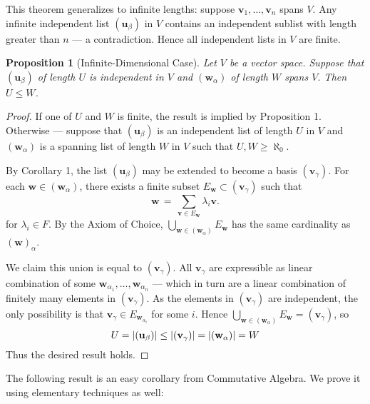 \documentclass[11pt]{article}
\newtheorem{proposition}{Proposition}
\renewcommand{\vec}[1]{\mathbf{#1}}
\begin{document}
This theorem generalizes to infinite lengths: suppose $\vec{v}_{1}, \ldots, \vec{v}_{n}$ spans $V$. Any infinite independent list $(\vec{u}_{\beta})$ in $V$ contains an independent sublist with length greater than $n$ --- a contradiction. Hence all independent lists in $V$ are finite.

\begin{adjustwidth}{0.5cm}{}
  \begin{proposition}[Infinite-Dimensional Case]
    Let $V$ be a vector space. Suppose that $(\vec{u}_{\beta})$ of length $U$ is independent in $V$ and $(\vec{w}_{\alpha})$ of length $W$ spans $V$. Then $U \le W$.
  \end{proposition}
  \begin{proof}
    If one of $U$ and $W$ is finite, the result is implied by Proposition 1. Otherwise --- suppose that $(\vec{u}_{\beta})$ is an independent list of length $U$ in $V$ and $(\vec{w}_{\alpha})$ is a spanning list of length $W$ in $V$ such that $U, W \ge \aleph_{0}$. 

    By Corollary 1, the list $(\vec{u}_{\beta})$ may be extended to become a basis $(\vec{v}_{\gamma})$. For each $\vec{w} \in (\vec{w}_{\alpha})$, there exists a finite subset $E_{\vec{w}} \subset (\vec{v}_{\gamma})$ such that
    \[
      \vec{w} \, = \, \sum\limits_{\vec{v} \in E_{\vec{w}}} \lambda_{i} \vec{v}.
    \]
    for $\lambda_{i} \in F$. By the Axiom of Choice, $\bigcup\limits_{\vec{w} \in (\vec{w}_{\alpha})} E_{\vec{w}}$ has the same cardinality as $(\vec{w})_{\alpha}$. 

    We claim this union is equal to $(\vec{v}_{\gamma})$. All $\vec{v}_{\gamma}$ are expressible as linear combination of some $\vec{w}_{\alpha_{1}}, \ldots, \vec{w}_{\alpha_{n}}$ --- which in turn are a linear combination of finitely many elements in $(\vec{v}_{\gamma})$. As the elements in $(\vec{v}_{\gamma})$ are independent, the only possibility is that $\vec{v}_{\gamma} \in E_{\vec{w}_{\alpha_{i}}}$ for some $i$. Hence $\bigcup\limits_{\vec{w} \in (\vec{w}_{\alpha})} E_{\vec{w}} = (\vec{v}_{\gamma})$, so
    \[
      U = \abs{(\vec{u}_{\beta})} \le \abs{(\vec{v}_{\gamma})} = \abs{(\vec{w}_{\alpha})} = W
    \]
    Thus the desired result holds.
  \end{proof}
\end{adjustwidth}

The following result is an easy corollary from Commutative Algebra. We prove it using elementary techniques as well:
\end{document}
